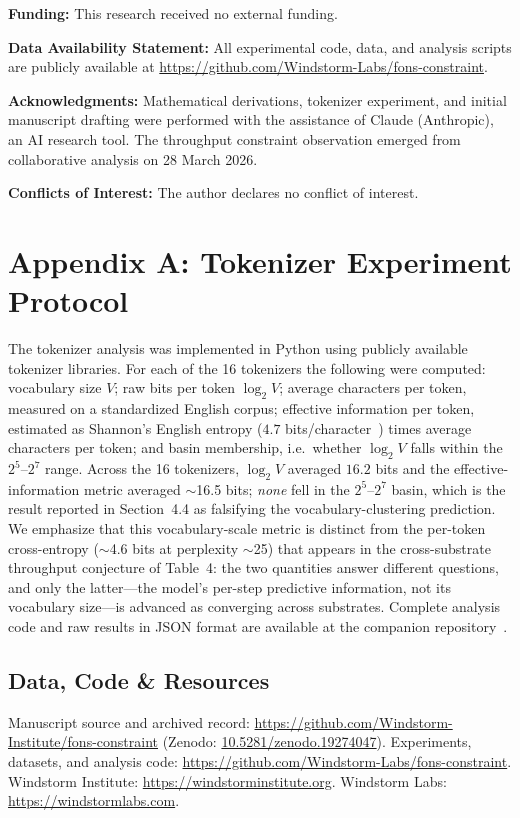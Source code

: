 \documentclass[11pt]{article}
\begin{document}
\noindent\textbf{Funding:} This research received no external funding.

\noindent\textbf{Data Availability Statement:} All experimental code, data, and analysis scripts are publicly available at \url{https://github.com/Windstorm-Labs/fons-constraint}.

\noindent\textbf{Acknowledgments:} Mathematical derivations, tokenizer experiment, and initial manuscript drafting were performed with the assistance of Claude (Anthropic), an AI research tool. The throughput constraint observation emerged from collaborative analysis on 28 March 2026.

\noindent\textbf{Conflicts of Interest:} The author declares no conflict of interest.

\section*{Appendix A: Tokenizer Experiment Protocol}

The tokenizer analysis was implemented in Python using publicly available tokenizer libraries. For each of the 16 tokenizers the following were computed: vocabulary size $V$; raw bits per token $\log_2 V$; average characters per token, measured on a standardized English corpus; effective information per token, estimated as Shannon's English entropy ($4.7$ bits/character~\cite{shannon1951}) times average characters per token; and basin membership, i.e.\ whether $\log_2 V$ falls within the $2^5$--$2^7$ range. Across the 16 tokenizers, $\log_2 V$ averaged $16.2$ bits and the effective-information metric averaged $\sim$16.5 bits; \emph{none} fell in the $2^5$--$2^7$ basin, which is the result reported in Section~4.4 as falsifying the vocabulary-clustering prediction. We emphasize that this vocabulary-scale metric is distinct from the per-token cross-entropy ($\sim$4.6 bits at perplexity $\sim$25) that appears in the cross-substrate throughput conjecture of Table~4: the two quantities answer different questions, and only the latter---the model's per-step predictive information, not its vocabulary size---is advanced as converging across substrates. Complete analysis code and raw results in JSON format are available at the companion repository~\cite{whitmer2026fons_code}.

\subsection*{Data, Code \& Resources}
\noindent Manuscript source and archived record: \url{https://github.com/Windstorm-Institute/fons-constraint} (Zenodo: \href{https://doi.org/10.5281/zenodo.19274047}{10.5281/zenodo.19274047}). Experiments, datasets, and analysis code: \url{https://github.com/Windstorm-Labs/fons-constraint}. Windstorm Institute: \url{https://windstorminstitute.org}. Windstorm Labs: \url{https://windstormlabs.com}.
\end{document}
